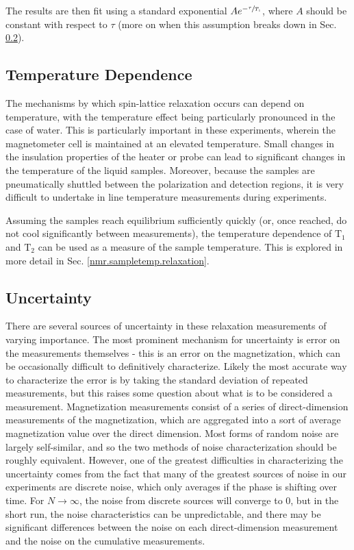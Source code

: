 \documentclass[PaulGanssle-Thesis.tex]{subfiles}
\begin{document}
The results are then fit using a standard exponential $Ae^{-\sfrac{\tau}{T_1}}$, where $A$ should be constant with respect to $\tau$ (more on when this assumption breaks down in Sec. \ref{relaxometry.t1.uncertainty}).

\subsection{Temperature Dependence}
\label{relaxometry.t1.tempdependence}
The mechanisms by which spin-lattice relaxation occurs can depend on temperature, with the temperature effect being particularly pronounced in the case of water.\cite{Hindman1973} This is particularly important in these experiments, wherein the magnetometer cell is maintained at an elevated temperature. Small changes in the insulation properties of the heater or probe can lead to significant changes in the temperature of the liquid samples. Moreover, because the samples are pneumatically shuttled between the polarization and detection regions, it is very difficult to undertake in line temperature measurements during experiments.

Assuming the samples reach equilibrium sufficiently quickly (or, once reached, do not cool significantly between measurements), the temperature dependence of $\mathrm{T}_{1}$ and $\mathrm{T}_{2}$ can be used as a measure of the sample temperature. This is explored in more detail in Sec. \ref{nmr.sampletemp.relaxation}.

\subsection{Uncertainty}
\label{relaxometry.t1.uncertainty}
There are several sources of uncertainty in these relaxation measurements of varying importance. The most prominent mechanism for uncertainty is error on the measurements themselves - this is an error on the magnetization, which can be occasionally difficult to definitively characterize. Likely the most accurate way to characterize the error is by taking the standard deviation of repeated measurements, but this raises some question about what is to be considered a measurement. Magnetization measurements consist of a series of direct-dimension measurements of the magnetization, which are aggregated into a sort of average magnetization value over the direct dimension. Most forms of random noise are largely self-similar, and so the two methods of noise characterization should be roughly equivalent. However, one of the greatest difficulties in characterizing the uncertainty comes from the fact that many of the greatest sources of noise in our experiments are discrete noise, which only averages if the phase is shifting over time. For $N\rightarrow\infty$, the noise from discrete sources will converge to 0, but in the short run, the noise characteristics can be unpredictable, and there may be significant differences between the noise on each direct-dimension measurement and the noise on the cumulative measurements.
\end{document}
